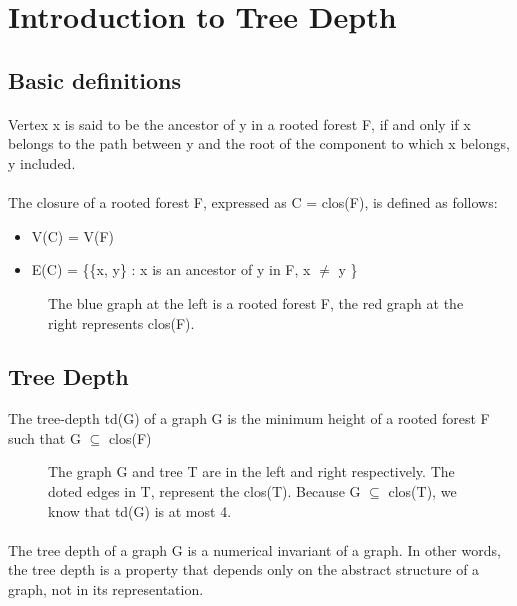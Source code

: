\section{Introduction to Tree Depth}

\subsection{Basic definitions}

\paragraph{}
Vertex x is said to be the ancestor of y in a rooted forest F, if and only if x belongs to the path between y and the root of the component to which x belongs, y included.
\paragraph{}
The closure of a rooted forest F, expressed as C = clos(F), is defined as follows:
\begin{itemize}
  \item V(C) = V(F)
  \item E(C) = \{\{x, y\} : x is an ancestor of y in F, x $\neq$ y \}
\end{itemize}
\begin{figure}[h]

\caption{The blue graph at the left is a rooted forest F, the red graph at the right represents clos(F).}
\end{figure}

\subsection{Tree Depth}

\begin{definition}
The tree-depth td(G) of a graph G is the minimum height of a rooted forest F such that G $\subseteq$ clos(F)
\end{definition}

\begin{figure}[H]

\caption{The graph G and tree T are in the left and right respectively. The doted edges in T, represent the clos(T). Because G $\subseteq$ clos(T), we know that td(G) is at most 4.\label{fig:3d-cube}}
\end{figure}
\paragraph{}
The tree depth of a graph G is a numerical invariant of a graph. In other words, the tree depth is a property that depends only  on the abstract structure of a graph, not in its	 representation.	

